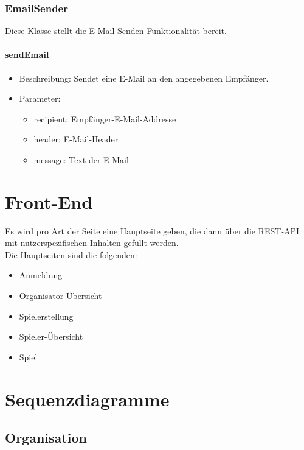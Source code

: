\documentclass[a4paper]{scrreprt}
\begin{document}
	\subsection{EmailSender}
	Diese Klasse stellt die E-Mail Senden Funktionalität bereit.
	\subsubsection{sendEmail}
	\begin{itemize}
		\item Beschreibung: Sendet eine E-Mail an den angegebenen Empfänger.
		\item Parameter:
		\begin{itemize}
			\item recipient: Empfänger-E-Mail-Addresse
			\item header: E-Mail-Header
			\item message: Text der E-Mail
		\end{itemize}
	\end{itemize}




	\chapter{Front-End}
	Es wird pro Art der Seite eine Hauptseite geben, die dann über die REST-API mit nutzerspezifischen Inhalten gefüllt werden. \\
	Die Hauptseiten sind die folgenden: \\
	\begin{itemize}
		\item   Anmeldung
		\item   Organisator-Übersicht
		\item   Spielerstellung
		\item   Spieler-Übersicht
		\item   Spiel
	\end{itemize}


	\chapter{Sequenzdiagramme}

	\section{Organisation}
\end{document}
